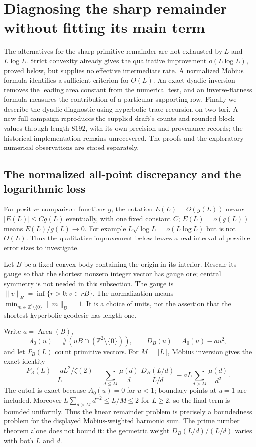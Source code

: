 \section{Diagnosing the sharp remainder without fitting its main term}
\label{sec:sharpdiagnostics}

The alternatives for the sharp primitive remainder are not exhausted by
$L$ and $L\log L$. Strict convexity already gives the qualitative
improvement $o(L\log L)$, proved below, but supplies no effective
intermediate rate. A normalized M\"obius formula identifies a sufficient
criterion for $O(L)$. An exact dyadic inversion removes the leading area
constant from the numerical test, and an inverse-flatness formula measures
the contribution of a particular supporting row. Finally we describe the
dyadic diagnostic using hyperbolic trace recursion on two tori. A new
full campaign reproduces the supplied draft's counts and rounded block
values through length $8192$, with its own precision and provenance
records; the historical implementation remains unrecovered.
The proofs and the exploratory numerical observations are stated separately.

\subsection{The normalized all-point discrepancy and the logarithmic loss}
\label{subsec:mobiusmodulus}

For positive comparison functions $g$, the notation $E(L)=O(g(L))$
means $|E(L)|\le Cg(L)$ eventually, with one fixed constant $C$;
$E(L)=o(g(L))$ means $E(L)/g(L)\to0$.
For example $L\sqrt{\log L}=o(L\log L)$ but is not $O(L)$.
Thus the qualitative improvement below leaves a real interval of
possible error sizes to investigate.

Let $B$ be a fixed convex body containing the origin in its interior.
Rescale its gauge so that the shortest nonzero integer vector has gauge one;
central symmetry is not needed in this subsection.
The gauge is $\|v\|_B=\inf\{r>0:v\in rB\}$.
The normalization means $\min_{m\in\mathbb Z^2\setminus\{0\}}
\|m\|_B=1$. It is a choice of units, not the assertion that the
shortest hyperbolic geodesic has length one.

Write $a=\operatorname{Area}(B)$,
\[
 A_0(u)=\#(uB\cap(\mathbb Z^2\setminus\{0\})),\qquad
 D_B(u)=A_0(u)-a u^2,
\]
and let $P_B(L)$ count primitive vectors. For $M=\lfloor L\rfloor$,
M\"obius inversion gives the exact identity
\begin{equation}
 \frac{P_B(L)-aL^2/\zeta(2)}{L}
 =\sum_{d\le M}\frac{\mu(d)}d\,
       \frac{D_B(L/d)}{L/d}
   -aL\sum_{d>M}\frac{\mu(d)}{d^2}.
 \label{eq:primitiveexactnormalizedmobius}
\end{equation}
The cutoff is exact because $A_0(u)=0$ for $u<1$; boundary points at
$u=1$ are included. Moreover
$L\sum_{d>M}d^{-2}\le L/M\le2$ for $L\ge2$, so the final term
is bounded uniformly. Thus the linear
remainder problem is precisely a boundedness problem for the displayed
M\"obius-weighted harmonic sum. The prime number theorem alone does not
bound it: the geometric weight $D_B(L/d)/(L/d)$ varies with both $L$ and $d$.


